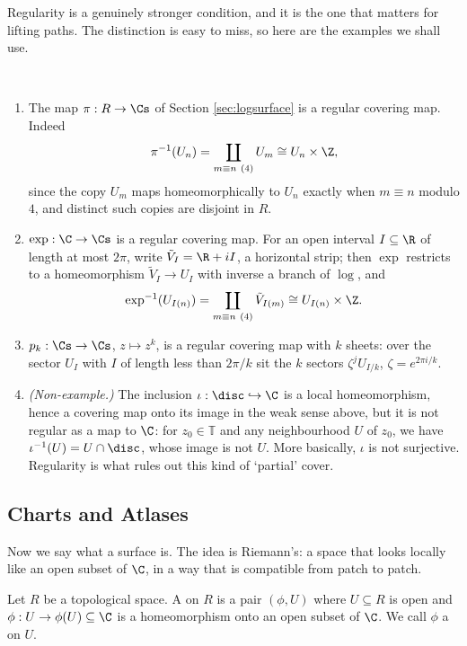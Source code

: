 Regularity is a genuinely stronger condition, and it is the one that matters for lifting
paths. The distinction is easy to miss, so here are the examples we shall use.

\begin{example}\
	\begin{enumerate}[label=(\roman*)]
		\item The map $\pi : R \to \Cs$ of Section \ref{sec:logsurface} is a regular
		covering map. Indeed
		$$
		\pi^{-1}(U_n) = \coprod_{m \equiv n \ (4)} U_m \cong U_n \times \Z,
		$$
		since the copy $U_m$ maps homeomorphically to $U_n$ exactly when $m \equiv n$
		modulo $4$, and distinct such copies are disjoint in $R$.

		\item $\exp : \C \to \Cs$ is a regular covering map. For an open interval
		$I \subseteq \R$ of length at most $2\pi$, write $\tilde V_I = \R + iI$, a
		horizontal strip; then $\exp$ restricts to a homeomorphism $\tilde V_I \to U_I$
		with inverse a branch of $\log$, and
		$$
		\exp^{-1}(U_{I(n)}) = \coprod_{m \equiv n \ (4)} \tilde V_{I(m)} \cong U_{I(n)} \times \Z.
		$$

		\item $p_k : \Cs \to \Cs$, $z \mapsto z^k$, is a regular covering map with $k$
		sheets: over the sector $U_I$ with $I$ of length less than $2\pi/k$ sit the $k$
		sectors $\zeta^j U_{I/k}$, $\zeta = e^{2\pi i /k}$.

		\item \emph{(Non-example.)} The inclusion $\iota : \disc \hookrightarrow \C$ is a
		local homeomorphism, hence a covering map onto its image in the weak sense above,
		but it is not regular as a map to $\C$: for $z_0 \in \mathbb{T}$ and any
		neighbourhood $U$ of $z_0$, we have $\iota^{-1}(U) = U \cap \disc$, whose image is
		not $U$. More basically, $\iota$ is not surjective. Regularity is what rules out
		this kind of `partial' cover.
	\end{enumerate}
\end{example}

\subsection{Charts and Atlases}

Now we say what a surface is. The idea is Riemann's: a space that looks locally like an
open subset of $\C$, in a way that is compatible from patch to patch.

\begin{definition}[Chart]
	Let $R$ be a topological space. A  on $R$ is a pair $(\phi, U)$ where
	$U \subseteq R$ is open and $\phi : U \to \phi(U) \subseteq \C$ is a homeomorphism
	onto an open subset of $\C$. We call $\phi$ a \vocab{local coordinate} on $U$.
\end{definition}

